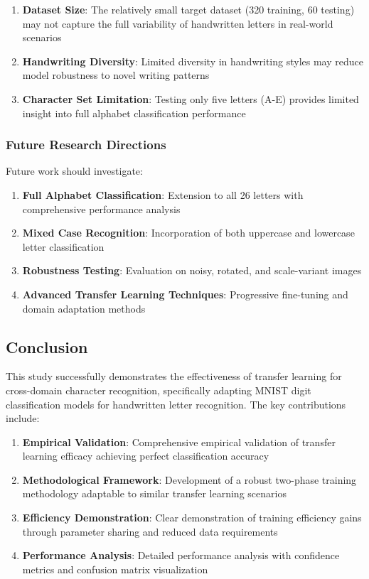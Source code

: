 \documentclass[12pt,a4paper]{article}
\begin{document}
\begin{enumerate}
    \item \textbf{Dataset Size}: The relatively small target dataset (320 training, 60 testing) may not capture the full variability of handwritten letters in real-world scenarios
    \item \textbf{Handwriting Diversity}: Limited diversity in handwriting styles may reduce model robustness to novel writing patterns
    \item \textbf{Character Set Limitation}: Testing only five letters (A-E) provides limited insight into full alphabet classification performance
\end{enumerate}

\subsubsection{Future Research Directions}

Future work should investigate:
\begin{enumerate}
    \item \textbf{Full Alphabet Classification}: Extension to all 26 letters with comprehensive performance analysis
    \item \textbf{Mixed Case Recognition}: Incorporation of both uppercase and lowercase letter classification
    \item \textbf{Robustness Testing}: Evaluation on noisy, rotated, and scale-variant images
    \item \textbf{Advanced Transfer Learning Techniques}: Progressive fine-tuning and domain adaptation methods
\end{enumerate}

\subsection{Conclusion}

This study successfully demonstrates the effectiveness of transfer learning for cross-domain character recognition, specifically adapting MNIST digit classification models for handwritten letter recognition. The key contributions include:

\begin{enumerate}
    \item \textbf{Empirical Validation}: Comprehensive empirical validation of transfer learning efficacy achieving perfect classification accuracy
    \item \textbf{Methodological Framework}: Development of a robust two-phase training methodology adaptable to similar transfer learning scenarios
    \item \textbf{Efficiency Demonstration}: Clear demonstration of training efficiency gains through parameter sharing and reduced data requirements
    \item \textbf{Performance Analysis}: Detailed performance analysis with confidence metrics and confusion matrix visualization
\end{enumerate}
\end{document}
